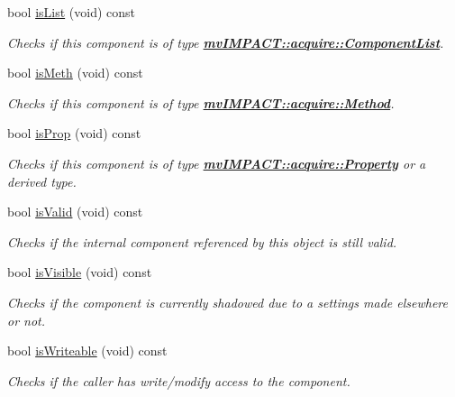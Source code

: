 \begin{DoxyCompactItemize}
bool \hyperlink{classmv_i_m_p_a_c_t_1_1acquire_1_1_component_a38268d1606ad93359a7f5fa3304da8bd}{is\+List} (void) const 
\begin{DoxyCompactList}\small\item\em Checks if this component is of type {\bfseries \hyperlink{classmv_i_m_p_a_c_t_1_1acquire_1_1_component_list}{mv\+I\+M\+P\+A\+C\+T\+::acquire\+::\+Component\+List}}. \end{DoxyCompactList}\item 
bool \hyperlink{classmv_i_m_p_a_c_t_1_1acquire_1_1_component_a2281da2df8cf67acc9f26b68aa0718cd}{is\+Meth} (void) const 
\begin{DoxyCompactList}\small\item\em Checks if this component is of type {\bfseries \hyperlink{classmv_i_m_p_a_c_t_1_1acquire_1_1_method}{mv\+I\+M\+P\+A\+C\+T\+::acquire\+::\+Method}}. \end{DoxyCompactList}\item 
bool \hyperlink{classmv_i_m_p_a_c_t_1_1acquire_1_1_component_aed95ea2f827d0fd457d03857516e0b68}{is\+Prop} (void) const 
\begin{DoxyCompactList}\small\item\em Checks if this component is of type {\bfseries \hyperlink{classmv_i_m_p_a_c_t_1_1acquire_1_1_property}{mv\+I\+M\+P\+A\+C\+T\+::acquire\+::\+Property}} or a derived type. \end{DoxyCompactList}\item 
bool \hyperlink{classmv_i_m_p_a_c_t_1_1acquire_1_1_component_ac51e55e7e046101f3c6119d84123abd5}{is\+Valid} (void) const 
\begin{DoxyCompactList}\small\item\em Checks if the internal component referenced by this object is still valid. \end{DoxyCompactList}\item 
bool \hyperlink{classmv_i_m_p_a_c_t_1_1acquire_1_1_component_ae9f95ac45440af06f7d36990ad633a73}{is\+Visible} (void) const 
\begin{DoxyCompactList}\small\item\em Checks if the component is currently shadowed due to a settings made elsewhere or not. \end{DoxyCompactList}\item 
bool \hyperlink{classmv_i_m_p_a_c_t_1_1acquire_1_1_component_ac59a8e19513c8508ec72cccee4b3eff6}{is\+Writeable} (void) const 
\begin{DoxyCompactList}\small\item\em Checks if the caller has write/modify access to the component. \end{DoxyCompactList}\item 

\end{DoxyCompactItemize}
